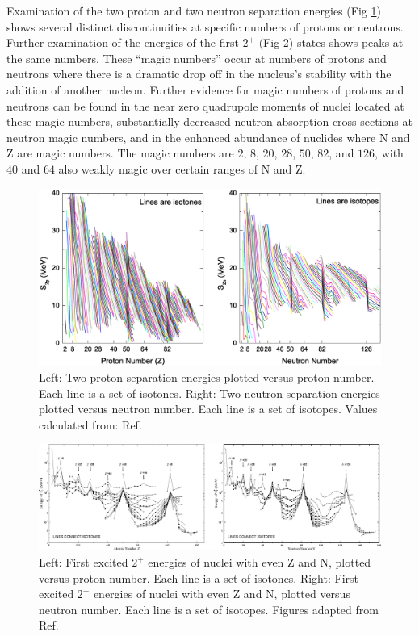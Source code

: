 Examination of the two proton and two neutron separation energies (Fig \ref{fig:chp2-masses}) shows several distinct discontinuities at specific numbers of protons or neutrons. Further examination of the energies of the first $2^+$ (Fig \ref{fig:chp2-two-plus-energies}) states shows peaks at the same numbers. These ``magic numbers'' occur at numbers of protons and neutrons where there is a dramatic drop off in the nucleus's stability with the addition of another nucleon. Further evidence for magic numbers of protons and neutrons can be found in the near zero quadrupole moments of nuclei located at these magic numbers, substantially decreased neutron absorption cross-sections at neutron magic numbers, and in the enhanced abundance of nuclides where N and Z are magic numbers. The magic numbers are $2$, $8$, $20$, $28$, $50$, $82$, and $126$, with $40$ and $64$ also weakly magic over certain ranges of N and Z.

\begin{figure}[h!]
\centerline{\includegraphics[width=\textwidth]{./img/c2/2nuc_sep_en.eps}}
	\caption{Left: Two proton separation energies plotted versus proton number. Each line is a set of isotones. Right: Two neutron separation energies plotted versus neutron number. Each line is a set of isotopes. Values calculated from: Ref.\cite{AME20031,AME20032}\label{fig:chp2-masses}}
\end{figure}

\begin{figure}[h!]
\centerline{\includegraphics[width=\textwidth]{./img/c2/2_plus_en.eps}}
	\caption{Left: First excited $2^+$ energies of nuclei with even Z and N, plotted versus proton number. Each line is a set of isotones. Right: First excited $2^+$ energies of nuclei with even Z and N, plotted versus neutron number. Each line is a set of isotopes. Figures adapted from Ref.\cite{RamanTwoPlus}\label{fig:chp2-two-plus-energies}}
\end{figure}


